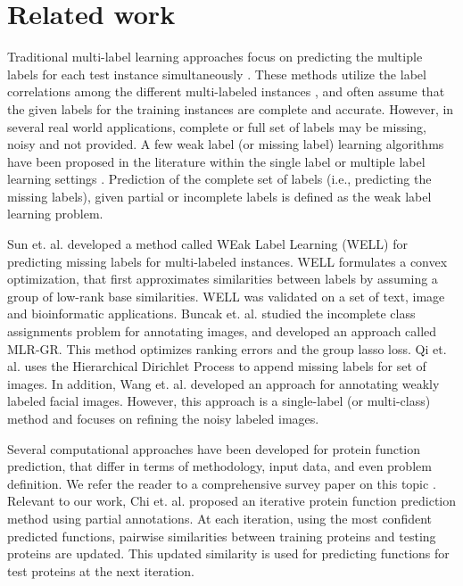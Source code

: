 \documentclass{llncs} %
\begin{document}
\section{Related work}
\label{relatedwork}
Traditional multi-label learning approaches focus on predicting the multiple labels for
each test instance simultaneously \cite{tsoumakas2010mining}. These methods utilize the label correlations among the different multi-labeled instances \cite{zhang2011framework}, and often assume that the given labels for the training instances are complete and accurate. However, in several real world applications, complete
or full set of labels may be missing, noisy and not provided. A few weak label (or missing label) learning algorithms have been proposed in the literature within the single label or multiple label learning settings \cite{bucak2011multi,sun2010multi,wang2011mining}. Prediction of the complete set of labels (i.e., predicting the missing labels), given partial or incomplete labels is defined as the weak label learning problem.

Sun et. al. \cite{sun2010multi} developed a method called WEak Label Learning (WELL) for predicting missing labels for multi-labeled instances. WELL formulates a convex optimization, that first approximates similarities between labels by assuming a group of low-rank base
similarities. WELL was validated on a set of text, image and bioinformatic applications.
Buncak  et. al. \cite{bucak2011multi} studied the incomplete class
assignments problem for annotating  images, and developed an approach called MLR-GR.
This method optimizes ranking errors and the group lasso loss.
Qi et. al. \cite{qi2011mining} uses the Hierarchical Dirichlet Process to append  missing
labels for set of  images. In addition, Wang et. al. \cite{wang2011mining} developed an approach for annotating weakly labeled facial images. However, this approach
is a single-label (or multi-class) method and focuses on refining the noisy labeled images.

Several computational approaches have been developed for protein function prediction, that
differ in terms of methodology, input data, and even problem definition. We refer the reader to a comprehensive survey paper on this topic \cite{pandey06}. Relevant to our work, Chi et. al. \cite{chi2011iterative} proposed an iterative
protein function prediction method using partial annotations. At each iteration, using the most confident predicted functions, pairwise similarities between training proteins and testing proteins are updated. This updated similarity is used for predicting functions for test proteins at the next iteration.
\end{document}
